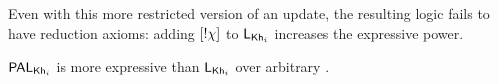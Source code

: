 
Even with this more restricted version of an update, the resulting logic fails to have reduction axioms: adding $[!\chi]$ to $\mathsf{L}_{{\sf Kh}_i}$ increases the expressive power.

\medskip 

\begin{proposition}\label{prop:exppal}
	$\mathsf{PAL}_{{\sf Kh}_i}$ is more expressive than $\mathsf{L}_{{\sf Kh}_i}$ over arbitrary \ultss.
\end{proposition}

